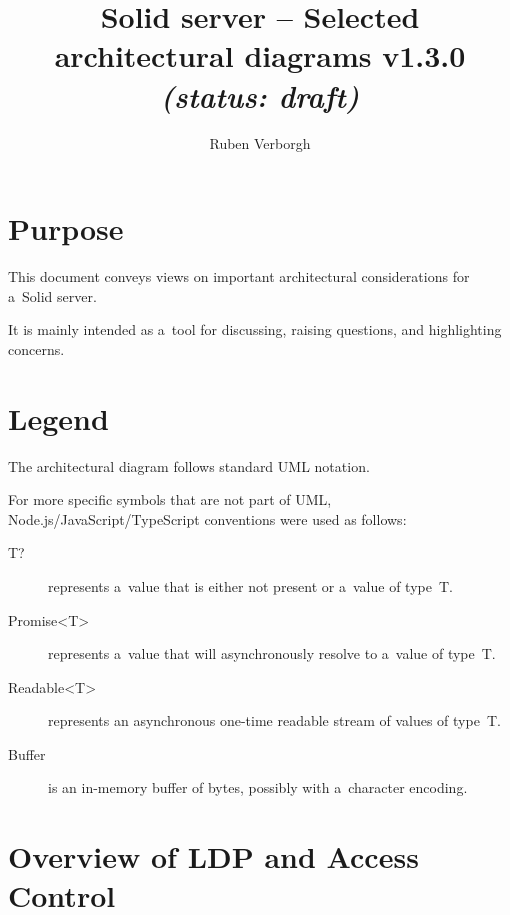 \documentclass[10pt]{article}
\title{
  Solid server -- Selected architectural diagrams v1.3.0
  \it (status: draft)
}
\author{Ruben Verborgh}
\begin{document}
\maketitle


\section*{Purpose}
This document conveys views
on important architectural considerations for a~Solid server.

It is mainly intended as a~tool for discussing,
raising questions,
and highlighting concerns.


\section*{Legend}
The architectural diagram follows standard UML notation.

For more specific symbols that are not part of UML,
Node.js/JavaScript/TypeScript conventions were used as follows:

\begin{description}
  \item[T?] represents a~value that is either not present
            or a~value of type~T.
  \item[Promise<T>] represents a~value that will asynchronously resolve
                    to a~value of type~T.
  \item[Readable<T>] represents an asynchronous one-time readable stream
                     of values of type~T.
  \item[Buffer] is an in-memory buffer of bytes,
                possibly with a~character encoding.
\end{description}

\clearpage

\section*{Overview of LDP and Access Control}

\newcommand\ResourceStoreBody{%
  + getRepresentation(ResourceIdentifier, RepresentationPreferences, Conditions?) : Promise<Representation>\\
  + addResource(container : ResourceIdentifier, Representation, Conditions?) : Promise<ResourceIdentifier>\\
  + setRepresentation(ResourceIdentifier, Representation, Conditions?) : Promise<void>\\
  + deleteResource(ResourceIdentifier, Conditions?) : Promise<void>\\
  + modifyResource(ResourceIdentifier, Patch, Conditions?) : Promise<void>\\
}
\end{document}

